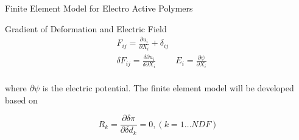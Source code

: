 \documentclass{beamer}
\begin{document}
\begin{frame}{Finite Element Model for Electro Active Polymers}

\begin{block}{Gradient of Deformation and Electric Field}
\begin{equation} 
\begin{aligned}
& F_{ij}=\frac{\partial u_i}{\partial X_{i}}+\delta_{ij} \\
& \delta F_{ij}=\frac{\delta \partial u_i}{\delta \partial X_{i}}
&E_{i}=\frac{\partial \psi}{\partial X_{i}}\\
\end{aligned}
\label{EQN:Disp_F_Relation}
\end{equation}
\end{block} 

where $\partial \psi$ is the electric potential.
The finite element model will be developed based on 

\begin{equation}
R_k=\frac{\partial \delta \pi}{\partial \delta d_k}=0 ,(k=1\dots NDF)
\label{EQN:ResidualRepresentation_0}
\end{equation}

\end{frame}
\end{document}
